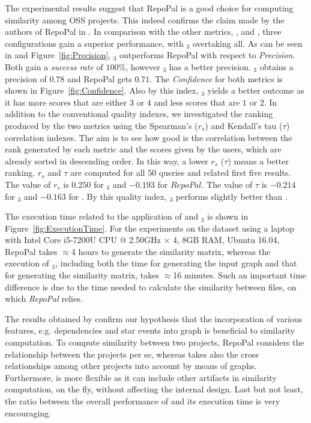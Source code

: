 The experimental results suggest that RepoPal is a good choice for computing similarity among OSS projects. This indeed confirms the claim made by the authors of RepoPal in \cite{10.1109/SANER.2017.7884605}. In comparison with the other metrics, \ie \MUDABlue, \CLAN and \RepoPal, three \CrossSim configurations gain a superior performance, with \CrossSimA$_{3}$ overtaking all. As can be seen in and Figure~\ref{fig:Precision}, \CrossSimA$_{3}$ outperforms RepoPal with respect to \textit{Precision}. Both gain a \textit{success rate} of $100\%$, however \CrossSimA$_{3}$ has a better precision. \CrossSimA$_{3}$ obtains a precision of $0.78$ and RepoPal gets $0.71$. The \textit{Confidence} for both metrics is shown in Figure~\ref{fig:Confidence}. Also by this index, \CrossSimA$_{3}$ yields a better outcome as it has more scores that are either $3$ or $4$ and less scores that are $1$ or $2$. In addition to the conventional quality indexes, we investigated the ranking produced by the two metrics using the Spearman's ($r_s$)  and  Kendall's tau ($\tau$) correlation indexes. 
The aim is to see how good is the correlation between the rank generated by each metric and the scores given by the users, which are already sorted in descending order. In this way, a lower $r_s$ ($\tau$) means a better ranking. $r_s$ and $\tau$ are computed for all $50$ queries and related first five results. The value of $r_s$ is $0.250$  for \CrossSimA$_{3}$ and $-0.193$   for $RepoPal$. The value of $\tau$ is $-0.214$  for \CrossSimA$_{3}$ and $-0.163$ for \RepoPal. By this quality index, \CrossSimA$_{3}$ performs slightly better than \RepoPal. 

The execution time related to the application of \RepoPal and \CrossSimA$_{3}$ is shown in Figure~\ref{fig:ExecutionTime}. For the experiments on the dataset using a laptop with Intel Core i5-7200U CPU @ 2.50GHz $\times$ 4, 8GB RAM, Ubuntu 16.04, RepoPal takes $\approx$4 hours to generate the similarity matrix, whereas the execution of \CrossSimA$_{3}$, including both the time for generating the input graph and that for generating the similarity matrix, takes $\approx$16 minutes. Such an important time difference is due to the time needed to calculate the similarity between  files, on which \textit{RepoPal} relies.

The results obtained by \CrossSim confirm our hypothesis that the incorporation of various features, e.g. dependencies and star events into graph is beneficial to similarity computation. To compute similarity between two projects, RepoPal considers the relationship between the projects per se, whereas \CrossSim takes also the cross relationships among other projects into account by means of graphs. Furthermore, \CrossSim is more flexible as it can include other artifacts in similarity computation, on the fly, without affecting the internal design. Last but not least, the ratio between the overall performance of \CrossSim and its execution time is very encouraging.


